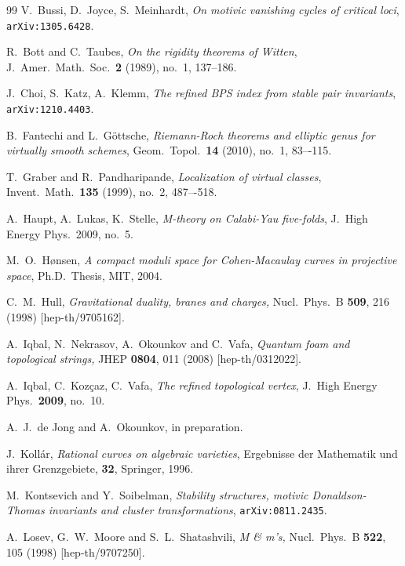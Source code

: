 \documentclass[12pt]{article}
\theoremstyle{definition}
\begin{document}
\begin{thebibliography}{99}
V.~Bussi, D.~Joyce, S.~Meinhardt, 
\emph{On motivic vanishing cycles of critical loci}, 
\texttt{arXiv:1305.6428}. 




 R.~Bott and C.~Taubes, 
\emph{On the rigidity theorems of Witten},
 J.\ Amer.\ Math.\ Soc.\ \textbf{2} (1989), no.~1, 137--186. 

J.~Choi, S.~Katz, A.~Klemm, 
\emph{The refined BPS index from stable pair invariants}, 
\texttt{arXiv:1210.4403}. 

B.~Fantechi and L.~G\"ottsche, 
\emph{Riemann-Roch theorems and elliptic genus for virtually smooth
  schemes}, 
 Geom.\ Topol.\ \textbf{14} (2010), no.~1, 83–-115. 

T.~Graber and R.~Pandharipande, 
\emph{Localization of virtual classes}, 
 Invent.\ Math.\ \textbf{135} (1999), no.~2, 487–-518. 

A.~Haupt, A.~Lukas, K.~Stelle, 
\emph{M-theory on Calabi-Yau five-folds}, 
J.\ High Energy Phys.\ 2009, no.~5. 

M.~O.~H{\o}nsen, 
\emph{A compact moduli space for Cohen-Macaulay curves in projective
  space},
Ph.D.\ Thesis, MIT, 2004. 


  C.~M.~Hull,
  \emph{Gravitational duality, branes and charges,}
  Nucl.\ Phys.\ B {\bf 509}, 216 (1998)
  [hep-th/9705162].
  
  
  A.~Iqbal, N.~Nekrasov, A.~Okounkov and C.~Vafa,
\emph{Quantum foam and topological strings,}
  JHEP {\bf 0804}, 011 (2008)
  [hep-th/0312022].
  
A.~Iqbal, C.~Koz\c{c}az, C.~Vafa, 
\emph{The refined topological vertex}, 
 J.~High Energy Phys.\ \textbf{2009}, no.~10. 

A.~J.~de Jong and A.~Okounkov, 
in preparation. 

J.~Koll\'ar, 
\emph{Rational curves on algebraic varieties},
 Ergebnisse der Mathematik und ihrer Grenzgebiete, \textbf{32},
 Springer, 1996.

M.~Kontsevich and Y.~Soibelman,
\emph{Stability structures, motivic Donaldson-Thomas invariants and cluster transformations},
\texttt{arXiv:0811.2435}. 

  A.~Losev, G.~W.~Moore and S.~L.~Shatashvili,
 \emph{M \& m's,}
  Nucl.\ Phys.\ B {\bf 522}, 105 (1998)
  [hep-th/9707250].
  

\end{thebibliography}
\end{document}
